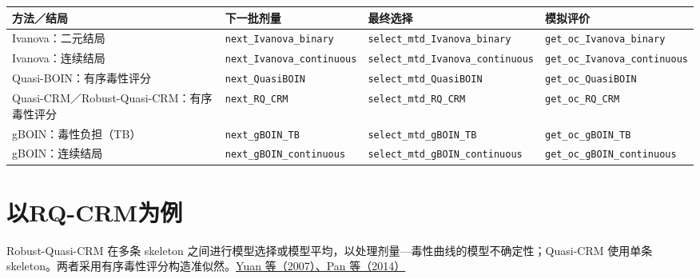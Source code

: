 \documentclass[
  chinese,
]{article}
\newcounter{none} %
\begin{document}
{\def\LTcaptype{none} %
\begin{longtable}[]{@{}
  >{\raggedright\arraybackslash}p{}
  >{\raggedright\arraybackslash}p{}
  >{\raggedright\arraybackslash}p{}
  >{\raggedright\arraybackslash}p{}@{}}
\toprule\noalign{}
\begin{minipage}[b]{\linewidth}\raggedright
方法／结局
\end{minipage} & \begin{minipage}[b]{\linewidth}\raggedright
下一批剂量
\end{minipage} & \begin{minipage}[b]{\linewidth}\raggedright
最终选择
\end{minipage} & \begin{minipage}[b]{\linewidth}\raggedright
模拟评价
\end{minipage} \\
\midrule\noalign{}
\endhead
\bottomrule\noalign{}
\endlastfoot
Ivanova：二元结局 & \texttt{next\_Ivanova\_binary} &
\texttt{select\_mtd\_Ivanova\_binary} &
\texttt{get\_oc\_Ivanova\_binary} \\
Ivanova：连续结局 & \texttt{next\_Ivanova\_continuous} &
\texttt{select\_mtd\_Ivanova\_continuous} &
\texttt{get\_oc\_Ivanova\_continuous} \\
Quasi-BOIN：有序毒性评分 & \texttt{next\_QuasiBOIN} &
\texttt{select\_mtd\_QuasiBOIN} & \texttt{get\_oc\_QuasiBOIN} \\
Quasi-CRM／Robust-Quasi-CRM：有序毒性评分 & \texttt{next\_RQ\_CRM} &
\texttt{select\_mtd\_RQ\_CRM} & \texttt{get\_oc\_RQ\_CRM} \\
gBOIN：毒性负担（TB） & \texttt{next\_gBOIN\_TB} &
\texttt{select\_mtd\_gBOIN\_TB} & \texttt{get\_oc\_gBOIN\_TB} \\
gBOIN：连续结局 & \texttt{next\_gBOIN\_continuous} &
\texttt{select\_mtd\_gBOIN\_continuous} &
\texttt{get\_oc\_gBOIN\_continuous} \\
\end{longtable}
}

\section{以RQ-CRM为例}\label{ux4ee5rq-crmux4e3aux4f8b}

Robust-Quasi-CRM 在多条 skeleton
之间进行模型选择或模型平均，以处理剂量---毒性曲线的模型不确定性；Quasi-CRM
使用单条
skeleton。两者采用有序毒性评分构造准似然。\hyperref[ux53c2ux8003ux8d44ux6599]{Yuan
等（2007）、Pan 等（2014）}
\end{document}
